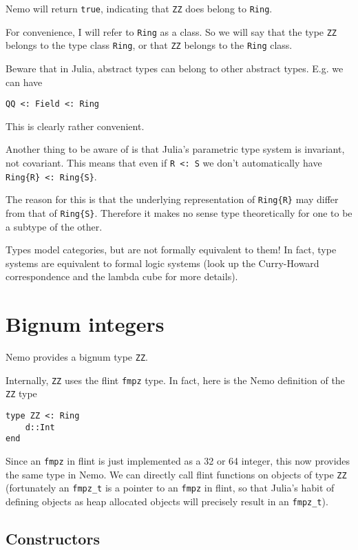 \documentclass[a4paper,10pt]{article}
\newcommand{\code}{\lstinline}
\begin{document}
{Nemo will return \code{true}, indicating that \code{ZZ} does belong to \code{Ring}.

For convenience, I will refer to \code{Ring} as a class. So we will say that the 
type \code{ZZ} belongs to the type class \code{Ring}, or that \code{ZZ} belongs to
the \code{Ring} class.

Beware that in Julia, abstract types can belong to other abstract types. E.g. we
can have

\begin{lstlisting}
QQ <: Field <: Ring
\end{lstlisting}

This is clearly rather convenient.

Another thing to be aware of is that Julia's parametric type system is invariant,
not covariant. This means that even if \code{R <: S} we don't automatically have
\code|Ring{R} <: Ring{S}|.

The reason for this is that the underlying representation of \code|Ring{R}| may
differ from that of \code|Ring{S}|. Therefore it makes no sense type theoretically
for one to be a subtype of the other.

Types model categories, but are not formally equivalent to them! In fact, type
systems are equivalent to formal logic systems (look up the Curry-Howard
correspondence and the lambda cube for more details).

\section{Bignum integers}

Nemo provides a bignum type \code{ZZ}.

Internally, \code{ZZ} uses the flint \code{fmpz} type. In fact, here is the Nemo
definition of the \code{ZZ} type

\begin{lstlisting}
type ZZ <: Ring
    d::Int
end
\end{lstlisting}

Since an \code{fmpz} in flint is just implemented as a 32 or 64 integer, this now 
provides the same type in Nemo. We can directly call flint functions on objects of
type \code{ZZ} (fortunately an \code{fmpz_t} is a pointer to an \code{fmpz} in 
flint, so that Julia's habit of defining objects as heap allocated objects will 
precisely result in an \code{fmpz_t}).

\subsection{Constructors}

}
\end{document}

